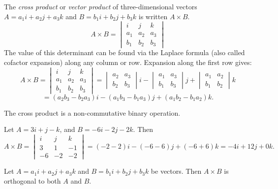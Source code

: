 \begin{defn}
    The \emph{cross product} or \emph{vector product} of three-dimensional vectors $A = a_1i + a_2j + a_3k$ and $B = b_1i + b_2j + b_3k$ is written $A \times B$. \[A \times B = \begin{vmatrix}
        i & j & k \\ a_1 & a_2 & a_3 \\ b_1 & b_2 & b_3
    \end{vmatrix}\] The value of this determinant can be found via the Laplace formula (also called cofactor expansion) along any column or row. Expansion along the first row gives: \[A \times B =
    \begin{vmatrix}
        i & j & k \\ a_1 & a_2 & a_3 \\ b_1 & b_2 & b_3
    \end{vmatrix} =
    \begin{vmatrix}
        a_2 & a_3 \\ b_2 & b_3
    \end{vmatrix}i -
    \begin{vmatrix}
        a_1 & a_3 \\ b_1 & b_3
    \end{vmatrix}j +
    \begin{vmatrix}
        a_1 & a_2 \\ b_1 & b_2
    \end{vmatrix}k\] \[= (a_2b_3 - b_2a_3)i - (a_1b_3 - b_1a_3)j + (a_1b_2 - b_1a_2)k.\]
\end{defn}

\begin{rmk}
    The cross product is a non-commutative binary operation.
\end{rmk}

\begin{exmp}
    Let $A = 3i + j - k$, and $B = -6i - 2j - 2k$. Then \[A \times B =
    \begin{vmatrix}
        i & j & k \\ 3 & 1 & -1 \\ -6 & -2 & -2
    \end{vmatrix} = (-2 - 2)i - (-6 - 6)j + (-6 + 6)k = -4i + 12j + 0k.\]
\end{exmp}

\begin{thm}
    Let $A = a_1i + a_2j + a_3k$ and $B = b_1i + b_2j + b_3k$ be vectors. Then $A \times B$ is orthogonal to both $A$ and $B$.
\end{thm}

